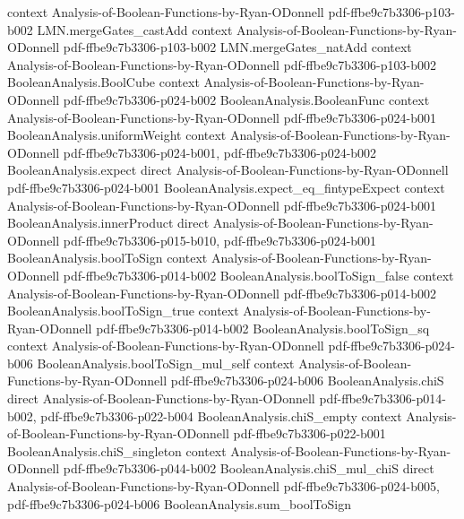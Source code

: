 \begin{theorem}
  {context}
  {Analysis-of-Boolean-Functions-by-Ryan-ODonnell}
  {pdf-ffbe9c7b3306-p103-b002}
\proofstep
  {LMN.mergeGates_castAdd}
  {context}
  {Analysis-of-Boolean-Functions-by-Ryan-ODonnell}
  {pdf-ffbe9c7b3306-p103-b002}
\proofstep
  {LMN.mergeGates_natAdd}
  {context}
  {Analysis-of-Boolean-Functions-by-Ryan-ODonnell}
  {pdf-ffbe9c7b3306-p103-b002}
\proofstep
  {BooleanAnalysis.BoolCube}
  {context}
  {Analysis-of-Boolean-Functions-by-Ryan-ODonnell}
  {pdf-ffbe9c7b3306-p024-b002}
\proofstep
  {BooleanAnalysis.BooleanFunc}
  {context}
  {Analysis-of-Boolean-Functions-by-Ryan-ODonnell}
  {pdf-ffbe9c7b3306-p024-b001}
\proofstep
  {BooleanAnalysis.uniformWeight}
  {context}
  {Analysis-of-Boolean-Functions-by-Ryan-ODonnell}
  {pdf-ffbe9c7b3306-p024-b001,
    pdf-ffbe9c7b3306-p024-b002}
\proofstep
  {BooleanAnalysis.expect}
  {direct}
  {Analysis-of-Boolean-Functions-by-Ryan-ODonnell}
  {pdf-ffbe9c7b3306-p024-b001}
\proofstep
  {BooleanAnalysis.expect_eq_fintypeExpect}
  {context}
  {Analysis-of-Boolean-Functions-by-Ryan-ODonnell}
  {pdf-ffbe9c7b3306-p024-b001}
\proofstep
  {BooleanAnalysis.innerProduct}
  {direct}
  {Analysis-of-Boolean-Functions-by-Ryan-ODonnell}
  {pdf-ffbe9c7b3306-p015-b010,
    pdf-ffbe9c7b3306-p024-b001}
\proofstep
  {BooleanAnalysis.boolToSign}
  {context}
  {Analysis-of-Boolean-Functions-by-Ryan-ODonnell}
  {pdf-ffbe9c7b3306-p014-b002}
\proofstep
  {BooleanAnalysis.boolToSign_false}
  {context}
  {Analysis-of-Boolean-Functions-by-Ryan-ODonnell}
  {pdf-ffbe9c7b3306-p014-b002}
\proofstep
  {BooleanAnalysis.boolToSign_true}
  {context}
  {Analysis-of-Boolean-Functions-by-Ryan-ODonnell}
  {pdf-ffbe9c7b3306-p014-b002}
\proofstep
  {BooleanAnalysis.boolToSign_sq}
  {context}
  {Analysis-of-Boolean-Functions-by-Ryan-ODonnell}
  {pdf-ffbe9c7b3306-p024-b006}
\proofstep
  {BooleanAnalysis.boolToSign_mul_self}
  {context}
  {Analysis-of-Boolean-Functions-by-Ryan-ODonnell}
  {pdf-ffbe9c7b3306-p024-b006}
\proofstep
  {BooleanAnalysis.chiS}
  {direct}
  {Analysis-of-Boolean-Functions-by-Ryan-ODonnell}
  {pdf-ffbe9c7b3306-p014-b002,
    pdf-ffbe9c7b3306-p022-b004}
\proofstep
  {BooleanAnalysis.chiS_empty}
  {context}
  {Analysis-of-Boolean-Functions-by-Ryan-ODonnell}
  {pdf-ffbe9c7b3306-p022-b001}
\proofstep
  {BooleanAnalysis.chiS_singleton}
  {context}
  {Analysis-of-Boolean-Functions-by-Ryan-ODonnell}
  {pdf-ffbe9c7b3306-p044-b002}
\proofstep
  {BooleanAnalysis.chiS_mul_chiS}
  {direct}
  {Analysis-of-Boolean-Functions-by-Ryan-ODonnell}
  {pdf-ffbe9c7b3306-p024-b005,
    pdf-ffbe9c7b3306-p024-b006}
\proofstep
  {BooleanAnalysis.sum_boolToSign}

\end{theorem}

